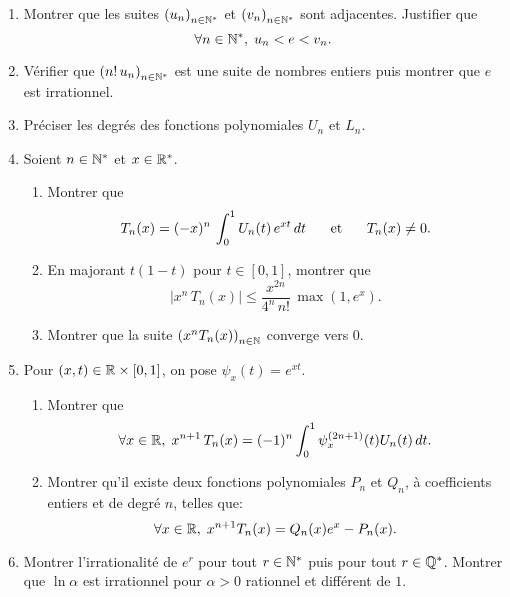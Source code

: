 \begin{enumerate}
 \item Montrer que les suites $\left( u_n \right)_{n \in \mathbb{N}^*}$ et $\left( v_n \right)_{n \in \mathbb{N}^*}$ sont adjacentes. Justifier que
 \[
  \forall n \in \mathbb{N}^*, \; u_n < e < v_n.
 \]

 \item Vérifier que $\left( n!\, u_n \right)_{n \in \mathbb{N}^*}$ est une suite de nombres entiers puis montrer que $e$ est irrationnel.

 \item Préciser les degrés des fonctions polynomiales $U_n$ et $L_n$.
 
 \item Soient $n\in \mathbb{N}^*$ et $x\in \mathbb{R}^*$.
 \begin{enumerate}
  \item Montrer que
\[
 T_n(x) = (-x)^n\, \int_0^1 U_n(t)\,e^{xt}\, dt \hspace{0.5cm}\text{ et }\hspace{0.5cm} T_n(x) \neq 0.
\]
  \item En majorant $t(1-t)$ pour $t \in \left[0,1\right]$,  montrer que 
\[
 \left|x^n\, T_n(x) \right| \leq \frac{x^{2n}}{4^n\, n!}\, \max(1,e^{x}).
\]
  \item Montrer que la suite $\left( x^n T_n(x) \right)_{n \in \mathbb{N}}$ converge vers $0$.
 \end{enumerate}

 \item Pour $(x,t) \in \mathbb{R} \times \left[ 0,1 \right]$, on pose $\psi_x(t) = e^{xt}$.
 \begin{enumerate}
  \item Montrer que
\[
 \forall x \in \mathbb{R}, \; x^{n+1}\,T_n(x) = (-1)^n \int_0^1\psi_x^{(2n+1)}(t) U_n(t)\,dt.
\]
  \item Montrer qu'il existe deux fonctions polynomiales $P_n$ et $Q_n$, à coefficients entiers et de degré $n$, telles que:
\[
 \forall x \in \mathbb{R},\; x^{n+1}T_n(x) = Q_n(x)e^{x} - P_n(x).
\]
 \end{enumerate}
 
 \item Montrer l'irrationalité de $e^r$ pour tout $r\in \mathbb{N}^*$ puis pour tout $r\in \mathbb{Q}^*$. Montrer que $\ln \alpha$ est irrationnel pour $\alpha > 0$ rationnel et différent de $1$.
\end{enumerate}